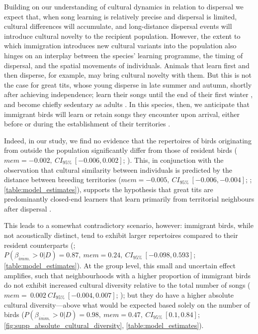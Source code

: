 Building on our understanding of cultural dynamics in relation to dispersal we expect that, when song learning is relatively precise and dispersal is limited, cultural differences will accumulate, and long-distance dispersal events will introduce cultural novelty to the recipient population. However, the extent to which immigration introduces new cultural variants into the population also hinges on an interplay between the species' learning programme, the timing of dispersal, and the spatial movements of individuals. Animals that learn first and then disperse, for example, may bring cultural novelty with them. But this is not the case for great tits, whose young disperse in late summer and autumn, shortly after achieving independence; learn their songs until the end of their first winter \parencite{rivera-gutierrez2011}, and become chiefly sedentary as adults \parencite{greenwood1979, dhondt1979, dingemanse2003}. In this species, then, we anticipate that immigrant birds will learn or retain songs they encounter upon arrival, either before or during the establishment of their territories \parencite{keen2020, graham2018}. 

Indeed, in our study, we find no evidence that the repertoires of birds originating from outside the population significantly differ from those of resident birds ($mem = -0.002,~CI_{95\%}~[-0.006, 0.002]$; ). This, in conjunction with the observation that cultural similarity between individuals is predicted by the distance between breeding territories ($mem = -0.005,~CI_{95\%}~[-0.006, -0.004]$; ; \autoref{table:model_estimates}), supports the hypothesis that great tits are predominantly closed-end learners that learn primarily from territorial neighbours after dispersal \parencite{mcgregor1982b, rivera-gutierrez2011, graham2017}.

This leads to a somewhat contradictory scenario, however: immigrant birds, while not acoustically distinct, tend to exhibit larger repertoires compared to their resident counterparts (; $P(\beta_{\overline{imm}.} > 0 | D) = 0.87,~mem=0.24,~CI_{95\%}~[-0.098, 0.593]$; \autoref{table:model_estimates}). At the group level, this small and uncertain effect amplifies, such that neighbourhoods with a higher proportion of immigrant birds do not exhibit increased cultural diversity relative to the total number of songs ($mem=~0.002~CI_{95\%}~[-0.004, 0.007]$; ); but they do have a higher absolute cultural diversity---above what would be expected based solely on the number of birds ($P(\beta_{\overline{imm}.} > 0 | D) = 0.98,~mem=0.47,~CI_{95\%}~[0.1, 0.84]$; \autoref{fig:supp_absolute_cultural_diversity}, \autoref{table:model_estimates}). 

